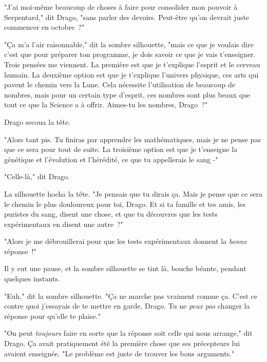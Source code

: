 "J'ai moi-même beaucoup de choses à faire pour consolider mon pouvoir à Serpentard," dit Drago, "sans parler des devoirs. Peut-être qu'on devrait juste commencer en octobre~?"

"Ça m'a l'air raisonnable," dit la sombre silhouette, "mais ce que je voulais dire c'est que pour préparer ton programme, je dois savoir ce que je vais t'enseigner. Trois pensées me viennent. La première est que je t'explique l'esprit et le cerveau humain. La deuxième option est que je t'explique l'univers physique, ces arts qui pavent le chemin vers la Lune. Cela nécessite l'utilisation de beaucoup de nombres, mais pour un certain type d'esprit, ces nombres sont plus beaux que tout ce que la Science a à offrir. Aimes-tu les nombres, Drago~?"

Drago secoua la tête.

"Alors tant pis. Tu finiras par apprendre les mathématiques, mais je ne pense pas que ce sera pour tout de suite. La troisième option est que je t'enseigne la génétique et l'évolution et l'hérédité, ce que tu appellerais le sang -"

"Celle-là," dit Drago.

La silhouette hocha la tête. "Je pensais que tu dirais ça. Mais je pense que ce sera le chemin le plus douloureux pour toi, Drago. Et si ta famille et tes amis, les puristes du sang, disent une chose, et que tu découvres que les tests expérimentaux en disent une autre~?"

"Alors je me débrouillerai pour que les tests expérimentaux donnent la \emph{bonne} réponse~!"

Il y eut une pause, et la sombre silhouette se tint là, bouche béante, pendant quelques instants.

"Euh," dit la sombre silhouette. "Ça ne marche pas vraiment comme ça. C'est ce contre quoi j'essayais de te mettre en garde, Drago. Tu ne \emph{peux pas} changer la réponse pour qu'elle te plaise."

"On peut \emph{toujours} faire en sorte que la réponse soit celle qui nous arrange," dit Drago. Ça avait pratiquement été la première chose que ses précepteurs lui avaient enseignée. "Le problème est juste de trouver les bons arguments."

